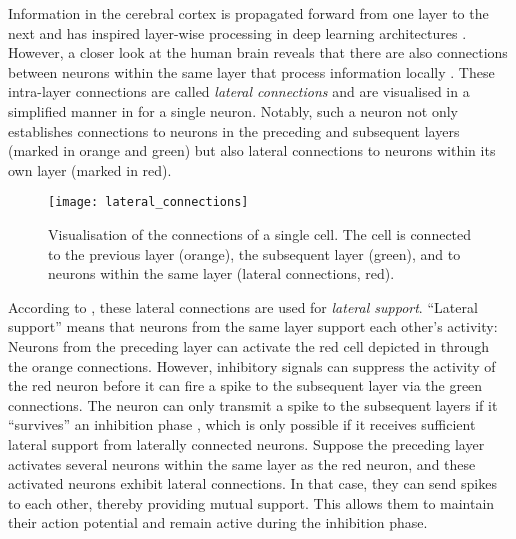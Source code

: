 Information in the cerebral cortex is propagated forward from one layer to the next and has inspired layer-wise processing in deep learning architectures .
However, a closer look at the human brain reveals that there are also connections between neurons within the same layer that process information locally .
These intra-layer connections are called \emph{lateral connections}  and are visualised in a simplified manner in  for a single neuron.
Notably, such a neuron not only establishes connections to neurons in the preceding and subsequent layers (marked in orange and green) but also lateral connections to neurons within its own layer (marked in red).

\begin{figure}[h]
    \centering
    \texttt{[image: lateral\_connections]}
    \caption[Lateral connections of a cell]{Visualisation of the connections of a single cell. The cell is connected to the previous layer (orange), the subsequent layer (green), and to neurons within the same layer (lateral connections, red).}
\end{figure}

According to , these lateral connections are used for \emph{lateral support}. ``Lateral support'' means that neurons from the same layer support each other's activity:
Neurons from the preceding layer can activate the red cell depicted in  through the orange connections.
However, inhibitory signals can suppress the activity  of the red neuron before it can fire a spike to the subsequent layer via the green connections. The neuron can only transmit a spike to the subsequent layers if it ``survives'' an inhibition phase , which is only possible if it receives sufficient lateral support  from laterally connected neurons.
Suppose the preceding layer activates several neurons within the same layer as the red neuron, and these activated neurons exhibit lateral connections. In that case, they can send spikes to each other, thereby providing mutual support. This allows them to maintain their action potential and remain active during the inhibition phase.

